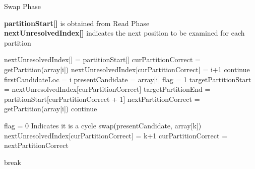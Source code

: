 \begin{algorithm}[h!]
\small
\caption{Swap Phase}
\label{alg:swap_phase}
\textbf{partitionStart[]} is obtained from Read Phase\\
\textbf{nextUnresolvedIndex[]} indicates the next position to be examined for each partition\\
\begin{algorithmic}[1]
\State nextUnresolvedIndex[] = partitionStart[]
	\State curPartitionCorrect = getPartition(array[i])
     \State nextUnresolvedIndex[curPartitionCorrect] = i+1
	\State continue
     \Else
     		\State firstCandidateLoc = i
			\State presentCandidate = array[i]             
            \State flag = 1
                \State targetPartitionStart = nextUnresolvedIndex[curPartitionCorrect]
                \State targetPartitionEnd = partitionStart[curPartitionCorrect + 1]
                \State nextPartitionCorrect = getPartition(array[i])
                        \State continue
                        
                        \State flag = 0 \Comment Indicates it is a cycle
                    \EndIf
                    \State swap(presentCandidate, array[k])
                    \State nextUnresolvedIndex[curPartitionCorrect] = k+1
                    \State curPartitionCorrect = nextPartitionCorrect
                    
                    \State break
             
				\EndFor
			\EndWhile
	\EndIf
\EndFor
{}
\end{algorithmic}

\end{algorithm}